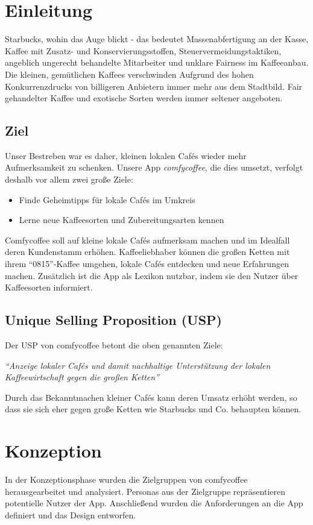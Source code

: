 \chapter{Einleitung}
\label{einleitung}
Starbucks, wohin das Auge blickt - das bedeutet Massenabfertigung an der Kasse, Kaffee mit Zusatz- und Konservierungsstoffen, Steuervermeidungstaktiken, angeblich ungerecht behandelte Mitarbeiter und unklare Fairness im Kaffeeanbau. Die kleinen, gemütlichen Kaffees verschwinden Aufgrund des hohen Konkurrenzdrucks von billigeren Anbietern immer mehr aus dem Stadtbild. Fair gehandelter Kaffee und exotische Sorten werden immer seltener angeboten.

\section{Ziel}
Unser Bestreben war es daher, kleinen lokalen Cafés wieder mehr Aufmerksamkeit zu schenken. Unsere App \emph{comfycoffee}, die dies umsetzt, verfolgt deshalb vor allem zwei große Ziele:
\begin{itemize}
	\item Finde Geheimtipps für lokale Cafés im Umkreis
	\item Lerne neue Kaffeesorten und Zubereitungsarten kennen
\end{itemize}
Comfycoffee soll auf kleine lokale Cafés aufmerksam machen und im Idealfall deren Kundenstamm erhöhen. Kaffeeliebhaber können die großen Ketten mit ihrem ``0815''-Kaffee umgehen, lokale Cafés entdecken und neue Erfahrungen machen. Zusätzlich ist die App als Lexikon nutzbar, indem sie den Nutzer über Kaffeesorten informiert. 

\section{Unique Selling Proposition (USP)}
Der USP von comfycoffee betont die oben genannten Ziele:

\begin{center}
\emph{``Anzeige lokaler Cafés und damit nachhaltige Unterstützung der lokalen Kaffeewirtschaft gegen die großen Ketten''}
\end{center}

Durch das Bekanntmachen kleiner Cafés kann deren Umsatz erhöht werden, so dass sie sich eher gegen große Ketten wie Starbucks und Co. behaupten können.

\chapter{Konzeption}
\label{konzeption}
In der Konzeptionsphase wurden die Zielgruppen von comfycoffee herausgearbeitet und analysiert. Personas aus der Zielgruppe repräsentieren potentielle Nutzer der App. Anschließend wurden die Anforderungen an die App definiert und das Design entworfen.

